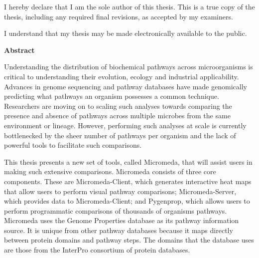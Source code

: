 \cleardoublepage %

 


  \noindent
I hereby declare that I am the sole author of this thesis. This is a true copy of the thesis, including any required final revisions, as accepted by my examiners.

  \bigskip
  
  \noindent
I understand that my thesis may be made electronically available to the public.

\cleardoublepage


\begin{center}\textbf{Abstract}\end{center}

Understanding the distribution of biochemical pathways across microorganisms is critical to understanding their evolution, ecology and industrial applicability. Advances in genome sequencing and pathway databases have made genomically predicting what pathways an organism possesses a common technique. Researchers are moving on to scaling such analyses towards comparing the presence and absence of pathways across multiple microbes from the same environment or lineage. However, performing such analyses at scale is currently bottlenecked by the sheer number of pathways per organism and the lack of powerful tools to facilitate such comparisons. 

This thesis presents a new set of tools, called Micromeda, that will assist users in making such extensive comparisons. Micromeda consists of three core components. These are Micromeda-Client, which generates interactive heat maps that allow users to perform visual pathway comparisons; Micromeda-Server, which provides data to Micromeda-Client; and Pygenprop, which allows users to perform programmatic comparisons of thousands of organisms pathways. Micromeda uses the Genome Properties database as its pathway information source. It is unique from other pathway databases because it maps directly between protein domains and pathway steps. The domains that the database uses are those from the InterPro consortium of protein databases. 

